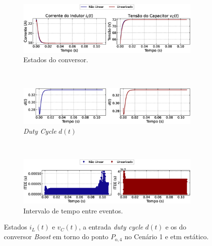\begin{figure}[H]
  \centering
  \captionsetup{justification=centering}
  \begin{subfigure}{1.\textwidth}
    \centering
    \includegraphics[width=1.\textwidth]{figuras/static-etm/boost/sim1/op2/result.eps}
    \caption{Estados do conversor.}
    \label{fig:boost_converter_constant_pcpl_static_etm_op2_duty_a}
  \end{subfigure}
  \\[6pt]
  \begin{subfigure}{1.\textwidth}
    \centering
    \includegraphics[width=1.\textwidth]{figuras/static-etm/boost/sim1/op2/duty-cycle.eps}
    \caption{\textit{Duty Cycle} $d(t)$}
    \label{fig:boost_converter_constant_pcpl_static_etm_op2_duty_b}
  \end{subfigure}
  \\[6pt]
  \begin{subfigure}{1.\textwidth}
    \centering
    \includegraphics[width=1.\textwidth]{figuras/static-etm/boost/sim1/op2/inter-event-times.eps}
    \caption{Intervalo de tempo entre eventos.}
    \label{fig:boost_converter_constant_pcpl_static_etm_op2_duty_c}
  \end{subfigure}
  \caption{Estados $i_L(t)$ e $v_C(t)$, a entrada \textit{duty cycle} $d(t)$ e os  do conversor \textit{Boost }em torno do ponto $P_{\mathrm{o}, 4}$ no Cenário 1 e \acrshort{etm} estático.}
\end{figure}

